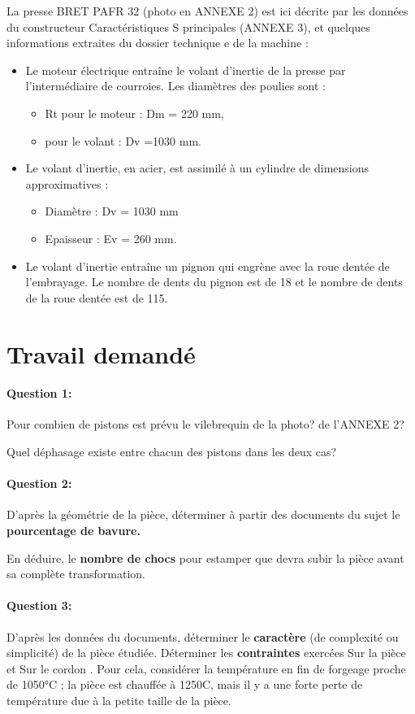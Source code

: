 La presse \og BRET PAFR 32 \fg (photo en ANNEXE 2) est ici décrite par les données du constructeur \og Caractéristiques S principales \fg (ANNEXE 3), et quelques informations extraites du dossier technique e de la machine :
\begin{itemize}
 \item Le moteur électrique entraîne le volant d'inertie de la presse par l'intermédiaire de courroies. Les diamètres des poulies sont :
 \begin{itemize}
  \item Rt pour le moteur : Dm = 220 mm,
  \item pour le volant : Dv =1030 mm.
 \end{itemize}
 \item Le volant d'inertie, en acier, est assimilé à un cylindre de dimensions approximatives :
 \begin{itemize}
  \item Diamètre : Dv = 1030 mm
  \item Epaisseur : Ev = 260 mm.
 \end{itemize}
 \item Le volant d'inertie entraîne un pignon qui engrène avec la roue dentée de l'embrayage. Le nombre de dents du pignon est de 18 et le nombre de dents de la roue dentée est de 115.
\end{itemize}

\section{Travail demandé}

\paragraph{Question 1:} Pour combien de pistons est prévu le vilebrequin de la photo? de l'ANNEXE 2?

Quel déphasage existe entre chacun des pistons dans les deux cas?

\paragraph{Question 2:} D'après la géométrie de la pièce, déterminer à partir des documents du sujet le \textbf{pourcentage de bavure.}

En déduire, le \textbf{nombre de chocs} pour estamper que devra subir la pièce avant sa complète transformation.

\paragraph{Question 3:} D'après les données du documents, déterminer le \textbf{caractère} (de complexité ou simplicité) de la pièce étudiée. Déterminer les \textbf{contraintes} exercées \og Sur la pièce \fg et \og Sur le cordon \fg. Pour cela, considérer la température en fin de forgeage proche de 1050°C ; la pièce est chauffée à 1250\textdegree C, mais il y a une forte perte de température due à la petite taille de la pièce.

